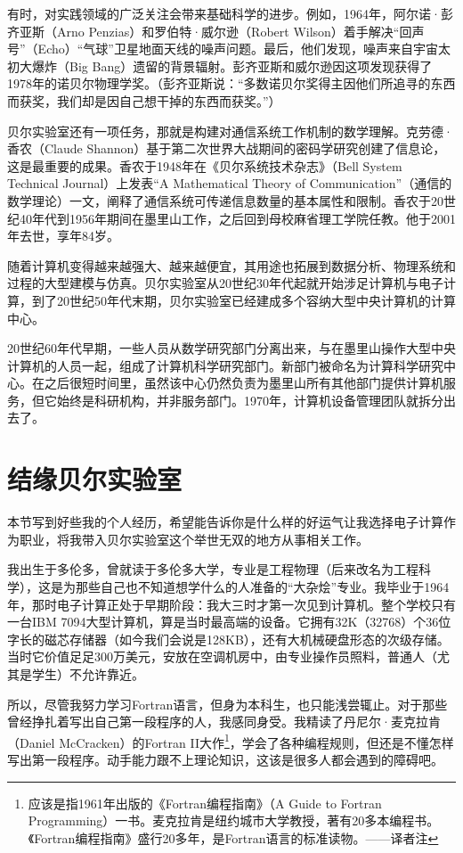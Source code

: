 \documentclass[a4paper,12pt,UTF8,twoside]{ctexbook}
\begin{document}
有时，对实践领域的广泛关注会带来基础科学的进步。例如，1964年，阿尔诺·彭齐亚斯（Arno Penzias）和罗伯特·威尔逊（Robert Wilson）着手解决“回声号”（Echo）“气球”卫星地面天线的噪声问题。最后，他们发现，噪声来自宇宙太初大爆炸（Big Bang）遗留的背景辐射。彭齐亚斯和威尔逊因这项发现获得了1978年的诺贝尔物理学奖。（彭齐亚斯说：“多数诺贝尔奖得主因他们所追寻的东西而获奖，我们却是因自己想干掉的东西而获奖。”）

贝尔实验室还有一项任务，那就是构建对通信系统工作机制的数学理解。克劳德·香农（Claude Shannon）基于第二次世界大战期间的密码学研究创建了信息论，这是最重要的成果。香农于1948年在《贝尔系统技术杂志》（Bell System Technical Journal）上发表“A Mathematical Theory of Communication”（通信的数学理论）一文，阐释了通信系统可传递信息数量的基本属性和限制。香农于20世纪40年代到1956年期间在墨里山工作，之后回到母校麻省理工学院任教。他于2001年去世，享年84岁。

随着计算机变得越来越强大、越来越便宜，其用途也拓展到数据分析、物理系统和过程的大型建模与仿真。贝尔实验室从20世纪30年代起就开始涉足计算机与电子计算，到了20世纪50年代末期，贝尔实验室已经建成多个容纳大型中央计算机的计算中心。

20世纪60年代早期，一些人员从数学研究部门分离出来，与在墨里山操作大型中央计算机的人员一起，组成了计算机科学研究部门。新部门被命名为计算科学研究中心。在之后很短时间里，虽然该中心仍然负责为墨里山所有其他部门提供计算机服务，但它始终是科研机构，并非服务部门。1970年，计算机设备管理团队就拆分出去了。

\section{结缘贝尔实验室}

本节写到好些我的个人经历，希望能告诉你是什么样的好运气让我选择电子计算作为职业，将我带入贝尔实验室这个举世无双的地方从事相关工作。

我出生于多伦多，曾就读于多伦多大学，专业是工程物理（后来改名为工程科学），这是为那些自己也不知道想学什么的人准备的“大杂烩”专业。我毕业于1964年，那时电子计算正处于早期阶段：我大三时才第一次见到计算机。整个学校只有一台IBM 7094大型计算机，算是当时最高端的设备。它拥有32K（32768）个36位字长的磁芯存储器（如今我们会说是128KB），还有大机械硬盘形态的次级存储。当时它价值足足300万美元，安放在空调机房中，由专业操作员照料，普通人（尤其是学生）不允许靠近。

所以，尽管我努力学习Fortran语言，但身为本科生，也只能浅尝辄止。对于那些曾经挣扎着写出自己第一段程序的人，我感同身受。我精读了丹尼尔·麦克拉肯（Daniel McCracken）的Fortran II大作\footnote{应该是指1961年出版的《Fortran编程指南》（A Guide to Fortran Programming）一书。麦克拉肯是纽约城市大学教授，著有20多本编程书。《Fortran编程指南》盛行20多年，是Fortran语言的标准读物。——译者注}，学会了各种编程规则，但还是不懂怎样写出第一段程序。动手能力跟不上理论知识，这该是很多人都会遇到的障碍吧。
\end{document}
